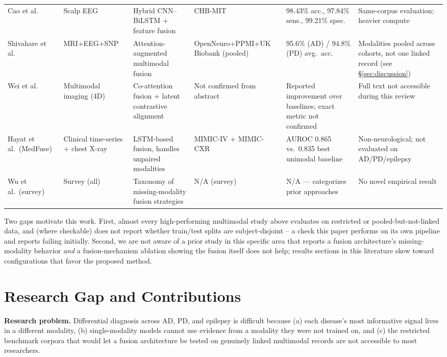 \documentclass[conference]{IEEEtran}
\begin{document}
\begin{table}[t]
\begin{tabular}{p{2.1cm}p{1.6cm}p{2.6cm}p{2.3cm}p{2.9cm}p{3.6cm}}
Cao et al.\ \cite{cao2025hybridcnnbilstm} & Scalp EEG & Hybrid CNN--BiLSTM + feature fusion & CHB-MIT & 98.43\% acc., 97.84\% sens., 99.21\% spec.\ & Same-corpus evaluation; heavier compute \\
Shivahare et al.\ \cite{shivahare2026attention} & MRI+EEG+SNP & Attention-augmented multimodal fusion & OpenNeuro+PPMI+UK Biobank (pooled) & 95.6\% (AD) / 94.8\% (PD) avg.\ acc.\ & Modalities pooled across cohorts, not one linked record (see \S\ref{sec:discussion}) \\
Wei et al.\ \cite{wei2025co_attention} & Multimodal imaging (4D) & Co-attention fusion + latent contrastive alignment & Not confirmed from abstract & Reported improvement over baselines; exact metric not confirmed & Full text not accessible during this review \\
Hayat et al.\ (MedFuse) \cite{hayat2022medfuse} & Clinical time-series + chest X-ray & LSTM-based fusion, handles unpaired modalities & MIMIC-IV + MIMIC-CXR & AUROC 0.865 vs.\ 0.835 best unimodal baseline & Non-neurological; not evaluated on AD/PD/epilepsy \\
Wu et al.\ (survey) \cite{wu2024missing_modality_survey} & Survey (all) & Taxonomy of missing-modality fusion strategies & N/A (survey) & N/A --- categorizes prior approaches & No novel empirical result \\
\bottomrule
\end{tabular}
\end{table}

Two gaps motivate this work. First, almost every high-performing
multimodal study above evaluates on restricted or pooled-but-not-linked
data, and (where checkable) does not report whether train/test splits
are subject-disjoint -- a check this paper performs on its own pipeline
and reports failing initially. Second, we are not aware of a prior study
in this specific area that reports a fusion architecture's
missing-modality behavior \emph{and} a fusion-mechanism ablation showing
the fusion itself does not help; results sections in this literature
skew toward configurations that favor the proposed method.

\section{Research Gap and Contributions}
\label{sec:contributions}

\textbf{Research problem.} Differential diagnosis across AD, PD, and
epilepsy is difficult because (a) each disease's most informative signal
lives in a different modality, (b) single-modality models cannot use
evidence from a modality they were not trained on, and (c) the
restricted benchmark corpora that would let a fusion architecture be
tested on genuinely linked multimodal records are not accessible to most
researchers.
\end{document}
